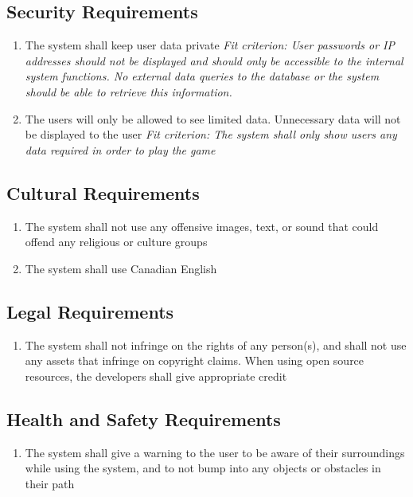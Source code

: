 \documentclass[12pt]{article}
\begin{document}
\subsection{Security Requirements}
\begin{enumerate}[SR\arabic*.]
    \item The system shall keep user data private\newline
    \textit{Fit criterion: User passwords or IP addresses should not be displayed and should only be accessible to the internal system functions. No external data queries to the database or the system should be able to retrieve this information.}
    \item The users will only be allowed to see limited data. Unnecessary data will not be displayed to the user\newline
    \textit{Fit criterion: The system shall only show users any data required in order to play the game}
\end{enumerate}
\subsection{Cultural Requirements}
\begin{enumerate}[CR\arabic*]
    \item The system shall not use any offensive images, text, or sound that could offend any religious or culture groups
    \item The system shall use Canadian English
\end{enumerate}
\subsection{Legal Requirements}
\begin{enumerate}[LR\arabic*]
    \item The system shall not infringe on the rights of any person(s), and shall not use any assets that infringe on copyright claims. When using open source resources, the developers shall give appropriate credit
\end{enumerate}
\subsection{Health and Safety Requirements}
\begin{enumerate}[HS\arabic*]
    \item The system shall give a warning to the user to be aware of their surroundings while using the system, and to not bump into any objects or obstacles in their path
\end{enumerate}
\end{document}
